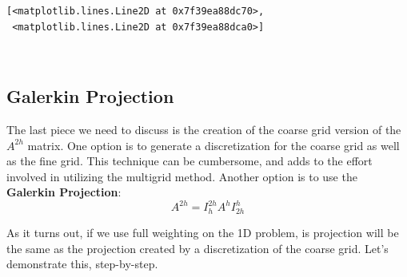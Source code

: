 \documentclass[11pt]{article}
\makeatletter
\newcommand{\boxspacing}{\kern\kvtcb@left@rule\kern\kvtcb@boxsep}
\newcommand{\prompt}[4]{
        \ttfamily\llap{{\color{#2}[#3]:\hspace{3pt}#4}}\vspace{-\baselineskip}
    }
\makeatother
\begin{document}
            \begin{tcolorbox}[breakable, size=fbox, boxrule=.5pt, pad at break*=1mm, opacityfill=0]
\prompt{Out}{outcolor}{10}{\boxspacing}
\begin{Verbatim}[commandchars=\\\{\}]
[<matplotlib.lines.Line2D at 0x7f39ea88dc70>,
 <matplotlib.lines.Line2D at 0x7f39ea88dca0>]
\end{Verbatim}
\end{tcolorbox}
        
    \begin{center}
    \end{center}
    { \hspace*{\fill} \\}
    
    \hypertarget{galerkin-projection}{%
\subsection{Galerkin Projection}\label{galerkin-projection}}

The last piece we need to discuss is the creation of the coarse grid
version of the \(A^{2h}\) matrix. One option is to generate a
discretization for the coarse grid as well as the fine grid. This
technique can be cumbersome, and adds to the effort involved in
utilizing the multigrid method. Another option is to use the
\textbf{Galerkin Projection}: \[
A^{2h} = I_h^{2h} A^h I_{2h}^h
\]

As it turns out, if we use full weighting on the 1D problem, is
projection will be the same as the projection created by a
discretization of the coarse grid. Let's demonstrate this, step-by-step.
\end{document}
